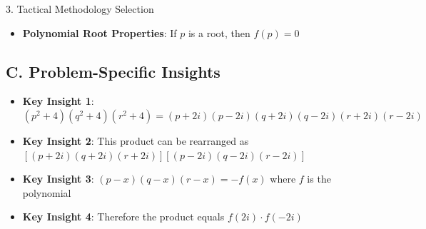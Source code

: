 \documentclass[12pt]{article}
\begin{document}
\begin{tacticsbox}{3. Tactical Methodology Selection}
\begin{itemize}[leftmargin=*]
    \item \textbf{Polynomial Root Properties}: If $p$ is a root, then $f(p) = 0$
\end{itemize}

\subsection*{C. Problem-Specific Insights}
\begin{itemize}[leftmargin=*]
    \item \textbf{Key Insight 1}: $(p^2 + 4)(q^2 + 4)(r^2 + 4) = (p + 2i)(p - 2i)(q + 2i)(q - 2i)(r + 2i)(r - 2i)$
    
    \item \textbf{Key Insight 2}: This product can be rearranged as $[(p + 2i)(q + 2i)(r + 2i)][(p - 2i)(q - 2i)(r - 2i)]$
    
    \item \textbf{Key Insight 3}: $(p - x)(q - x)(r - x) = -f(x)$ where $f$ is the polynomial
    
    \item \textbf{Key Insight 4}: Therefore the product equals $f(2i) \cdot f(-2i)$
\end{itemize}

\end{tacticsbox}
\end{document}
